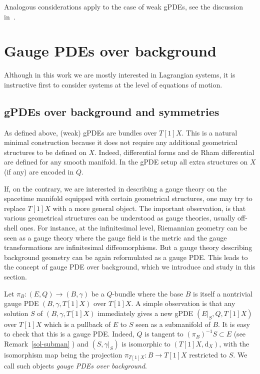 \documentclass[a4paper,12pt]{article}
\numberwithin{equation}{section} %
\newcommand{\dx}{\mathrm{d}_X}
\begin{document}
Analogous considerations apply to the case of weak gPDEs, see the discussion in~\cite{Grigoriev:2024ncm}.


\section{Gauge PDEs over background} \label{sec:bgpde}

Although in this work we are mostly interested in Lagrangian systems, it is instructive first to consider systems at the level of equations of motion. 

\subsection{gPDEs over background and symmetries} \label{subsec-bgrd-gPDE}

As defined above, (weak) gPDEs are bundles over $T[1]X$. This is a natural minimal construction because it does not require any additional geometrical structures to be defined on $X$. Indeed, differential forms and de Rham differential are defined for any smooth manifold. In the gPDE setup all extra structures on $X$ (if any) are encoded in $Q$.

If, on the contrary, we are interested in describing a gauge theory on the spacetime manifold equipped with certain geometrical structures, one may try to replace $T[1]X$ with a more general object.  The important observation, is that various geometrical structures can be understood as gauge theories, usually off-shell ones. For instance, at the infinitesimal level, Riemannian geometry can be seen as a gauge theory where the gauge field is the metric and the gauge transformations are infinitesimal diffeomorphisms. But a gauge theory describing background geometry can be again reformulated as a gauge PDE. This leads to the concept of gauge PDE over background, which we introduce and study in this section.

Let $\pi_B:(E,Q) \rightarrow (B,\gamma)$ be a $Q$-bundle where the base $B$ is itself a nontrivial gauge PDE $(B,\gamma,T[1]X)$ over $T[1]X$. A simple observation is that any solution $S$ of $(B,\gamma,T[1]X)$ immediately gives a new gPDE $(E|_{S},Q,T[1]X)$ over $T[1]X$ which is a pullback of $E$ to $S$ seen as a submanifold of $B$. It is easy to check that this is a gauge PDE. Indeed, $Q$ is tangent to $(\pi_B)^{-1}S\subset E$ (see Remark~\ref{sol-subman} ) and $(S,\gamma|_S)$ is isomorphic to $(T[1]X,\dx)$, with the isomorphism map being the projection $\pi_{T[1]X}:B \rightarrow T[1]X$ restricted to $S$. We call such objects \textit{gauge PDEs over background}. 
\end{document}
